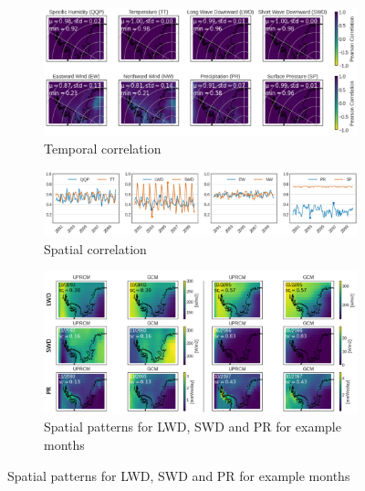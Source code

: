 \documentclass[a4paper,11pt,oneside]{report}
\begin{document}
\begin{figure}[!h]
        \centering
        \begin{subfigure}[b]{\columnwidth}
            \centering \includegraphics[width=\textwidth]{doc/Thesis-latex/images/results/temporalCorr_RCM_GCM.pdf}
            \caption[]%
            {{\small Temporal correlation}}    
          \label{fig:temp-corr-GCM-UPRCM}
        \end{subfigure}
        \hfill
            \begin{subfigure}[b]{\columnwidth}
            \centering \includegraphics[width=\textwidth]{doc/Thesis-latex/images/results/spatialCorr_TS_RCM_GCM.pdf}
            \caption[]%
            {{\small Spatial correlation}}    
          \label{fig:spatial-corr-GCM-UPRCM}
        \end{subfigure}
        \hfill
        \begin{subfigure}[b]{\columnwidth}  
            \centering 
            \includegraphics[width=\textwidth]{doc/Thesis-latex/images/results/spatialCorr_RCM_GCM.pdf}
            \caption[]%
            {{\small Spatial patterns for LWD, SWD and PR for example months}} \label{fig:spatial-corr-GCM-RCM-ex}

\end{subfigure}
\end{figure}
\end{document}
